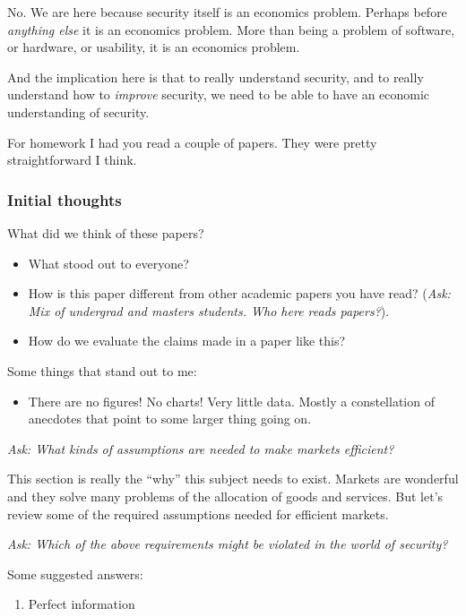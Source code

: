 \documentclass[11pt]{article}
\begin{document}
No. We are here because security itself is an economics problem. Perhaps before \textit{anything else} it is an economics problem. More than being a problem of software, or hardware, or usability, it is an economics problem.

And the implication here is that to really understand security, and to really understand how to \textit{improve} security, we need to be able to have an economic understanding of security. 

For homework I had you read a couple of papers. They were pretty straightforward I think.

\subsubsection{Initial thoughts}

What did we think of these papers?

\begin{itemize}
    \item What stood out to everyone?
    \item How is this paper different from other academic papers you have read? ({\it Ask: Mix of undergrad and masters students. Who here reads papers?}). 
    \item How do we evaluate the claims made in a paper like this?
\end{itemize}

Some things that stand out to me:

\begin{itemize}
    \item There are no figures! No charts! Very little data. Mostly a constellation of anecdotes that point to some larger thing going on.
\end{itemize}

{\it Ask: What kinds of assumptions are needed to make markets efficient?}


This section is really the ``why'' this subject needs to exist. 
Markets are wonderful and they solve many problems of the allocation of goods and services.
But let's review some of the required assumptions needed for efficient markets.

{\it Ask: Which of the above requirements might be violated in the world of security?}

Some suggested answers:
\begin{enumerate}
    \item Perfect information
\end{enumerate}
\end{document}

